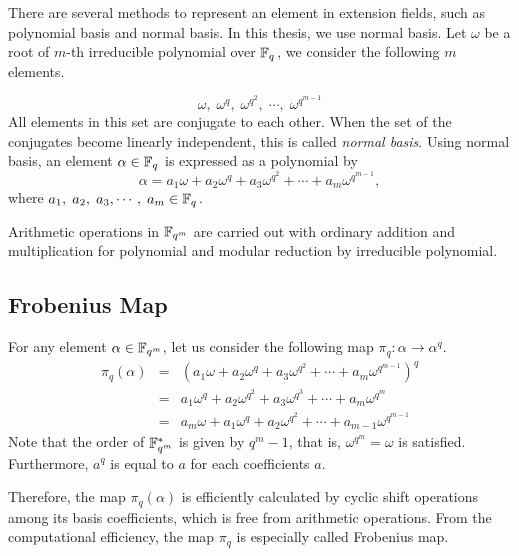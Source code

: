 There are several methods to represent an element in extension fields, such as polynomial basis and normal basis.
In this thesis, we use normal basis.
Let $\omega$ be a root of $m$-th irreducible polynomial over ${\mathbb{F}}_{q^{}}$, we consider the following $m$ elements.

\begin{equation}
\omega,\;\omega^q,\;\omega^{q^2},\;\cdots,\;\omega^{q^{m-1}} \nonumber
\end{equation}
All elements in this set are conjugate to each other.
When the set of the conjugates become linearly independent, this is called {\it normal basis}.
Using normal basis, an element $\alpha \in {\mathbb{F}}_{q^{}}$ is expressed as a polynomial by  
\begin{equation}
\alpha = a_1 \omega + a_2 \omega^q + a_3 \omega^{q^2} + \cdots + a_m \omega^{q^{m-1}}, 
\end{equation}
where $a_1,\;a_2,\;a_3,\cdots,\;a_m \in {\mathbb{F}}_{q^{}}$.

Arithmetic operations in ${\mathbb{F}}_{q^{m}}$ are carried out with ordinary addition and multiplication for polynomial and modular reduction by irreducible polynomial.

\subsection{Frobenius Map}\label{secFrob}

For any element $\alpha \in {\mathbb{F}}_{q^{m}}$, let us consider the following map $\pi_q:\alpha \rightarrow \alpha^q$. 
\begin{eqnarray}
\pi_q(\alpha) &=& \left( a_1 \omega + a_2 \omega^q + a_3 \omega^{q^2} + \cdots + a_m \omega^{q^{m-1}} \right)^q \nonumber \\ 
&=& a_1 \omega^q + a_2 \omega^{q^2} + a_3 \omega^{q^3} + \cdots + a_m \omega^{q^m} \nonumber \\
&=& a_m \omega + a_1 \omega^q + a_2 \omega^{q^2} + \cdots + a_{m-1} \omega^{q^{m-1}}
\end{eqnarray}
Note that the order of ${\mathbb{F}}_{q^{m}}^*$ is given by $q^m - 1$, that is,  $\omega^{q^m} = \omega$ is satisfied.
Furthermore, $a^q$ is equal to $a$ for each coefficients $a$.

Therefore, the map $\pi_q(\alpha)$ is efficiently calculated by cyclic shift operations among its basis coefficients, 
which is free from arithmetic operations.
From the computational efficiency, the map $\pi_q$ is especially called Frobenius map.

